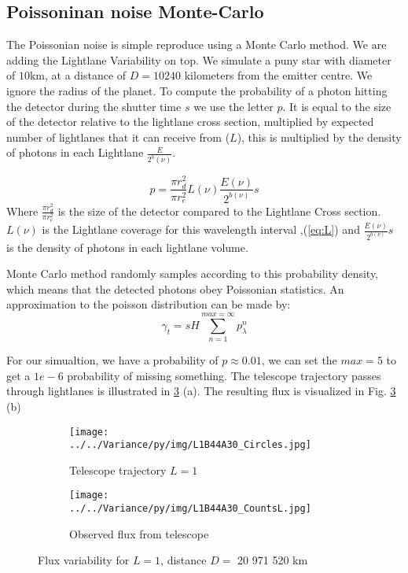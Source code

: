 \documentclass[notitlepage]{article}
\begin{document}
\subsection{Poissoninan noise Monte-Carlo}
The Poissonian noise is simple reproduce using a Monte Carlo method. We are adding the Lightlane Variability on top. We simulate a puny star with diameter of $10$km, at a distance of $D =10240$ kilometers from the emitter centre. We ignore the radius of the planet. To compute the probability of a photon hitting the detector during the shutter time $s$ we use the letter $p$. It is equal to the size of the detector relative to the lightlane cross section, multiplied by expected number of lightlanes that it can receive from ($L$), this is multiplied by the density of photons in each Lightlane $\frac{E}{2^b(\nu)}$.

\begin{equation}
p = \frac{\pi r_d^2}{\pi r_e^2}L(\nu) \frac{ E(\nu)}{2^{b(\nu)}} s
\end{equation}
Where $\frac{\pi r_d^2}{\pi r_e^2}$ is the size of the detector compared to the Lightlane Cross section. $L(\nu) $ is the Lightlane coverage for this wavelength interval ,(\eqref{eq:L}) and $\frac{ E(\nu)}{2^{b(\nu)}}s$ is the density of photons in each lightlane volume. 

Monte Carlo method randomly samples according to this probability density, which means that the detected photons obey Poissonian statistics.
An approximation to the poisson distribution can be made by:
\begin{equation}
\gamma_t = s H \sum_{n = 1}^{max = \infty} p_{\lambda}^n
\end{equation}

For our simualtion, we have a probability of $p \approx 0.01$, we can set the $max = 5$ to get a $1e-6$ probability of missing something. The telescope trajectory passes through lightlanes is illustrated in \ref{fig:observedFluxL1} (a). The resulting flux is visualized in Fig. \ref{fig:observedFluxL1} (b)

\begin{figure}
\centering

 \begin{subfigure}[t]{0.45\textwidth}
       
{\texttt{[image: ../../Variance/py/img/L1B44A30\_Circles.jpg]}}

\caption{Telescope trajectory $L = 1$}
\label{fig:telescopeTrajectory}
 \end{subfigure}
 \begin{subfigure}[t]{0.5\textwidth}
{\texttt{[image: ../../Variance/py/img/L1B44A30\_CountsL.jpg]}}
\caption{Observed flux from telescope}
\label{fig:observedFlux}
\end{subfigure}
\caption{Flux variability for $L =1$, distance $D = $ 20 971 520 km}
\label{fig:observedFluxL1}
\end{figure}
\end{document}
